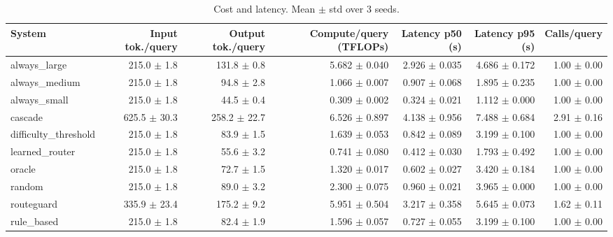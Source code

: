 \begin{table}[t]
\centering
\small
\caption{Cost and latency. Mean $\pm$ std over 3 seeds.}
\label{tab:efficiency}
\begin{tabular}{lrrrrrr}
\toprule
System & Input tok./query & Output tok./query & Compute/query (TFLOPs) & Latency p50 (s) & Latency p95 (s) & Calls/query \\
\midrule
always\_large & 215.0 $\pm$ 1.8 & 131.8 $\pm$ 0.8 & 5.682 $\pm$ 0.040 & 2.926 $\pm$ 0.035 & 4.686 $\pm$ 0.172 & 1.00 $\pm$ 0.00 \\
always\_medium & 215.0 $\pm$ 1.8 & 94.8 $\pm$ 2.8 & 1.066 $\pm$ 0.007 & 0.907 $\pm$ 0.068 & 1.895 $\pm$ 0.235 & 1.00 $\pm$ 0.00 \\
always\_small & 215.0 $\pm$ 1.8 & 44.5 $\pm$ 0.4 & 0.309 $\pm$ 0.002 & 0.324 $\pm$ 0.021 & 1.112 $\pm$ 0.000 & 1.00 $\pm$ 0.00 \\
cascade & 625.5 $\pm$ 30.3 & 258.2 $\pm$ 22.7 & 6.526 $\pm$ 0.897 & 4.138 $\pm$ 0.956 & 7.488 $\pm$ 0.684 & 2.91 $\pm$ 0.16 \\
difficulty\_threshold & 215.0 $\pm$ 1.8 & 83.9 $\pm$ 1.5 & 1.639 $\pm$ 0.053 & 0.842 $\pm$ 0.089 & 3.199 $\pm$ 0.100 & 1.00 $\pm$ 0.00 \\
learned\_router & 215.0 $\pm$ 1.8 & 55.6 $\pm$ 3.2 & 0.741 $\pm$ 0.080 & 0.412 $\pm$ 0.030 & 1.793 $\pm$ 0.492 & 1.00 $\pm$ 0.00 \\
oracle & 215.0 $\pm$ 1.8 & 72.7 $\pm$ 1.5 & 1.320 $\pm$ 0.017 & 0.602 $\pm$ 0.027 & 3.420 $\pm$ 0.184 & 1.00 $\pm$ 0.00 \\
random & 215.0 $\pm$ 1.8 & 89.0 $\pm$ 3.2 & 2.300 $\pm$ 0.075 & 0.960 $\pm$ 0.021 & 3.965 $\pm$ 0.000 & 1.00 $\pm$ 0.00 \\
routeguard & 335.9 $\pm$ 23.4 & 175.2 $\pm$ 9.2 & 5.951 $\pm$ 0.504 & 3.217 $\pm$ 0.358 & 5.645 $\pm$ 0.073 & 1.62 $\pm$ 0.11 \\
rule\_based & 215.0 $\pm$ 1.8 & 82.4 $\pm$ 1.9 & 1.596 $\pm$ 0.057 & 0.727 $\pm$ 0.055 & 3.199 $\pm$ 0.100 & 1.00 $\pm$ 0.00 \\
\bottomrule
\end{tabular}
\end{table}
